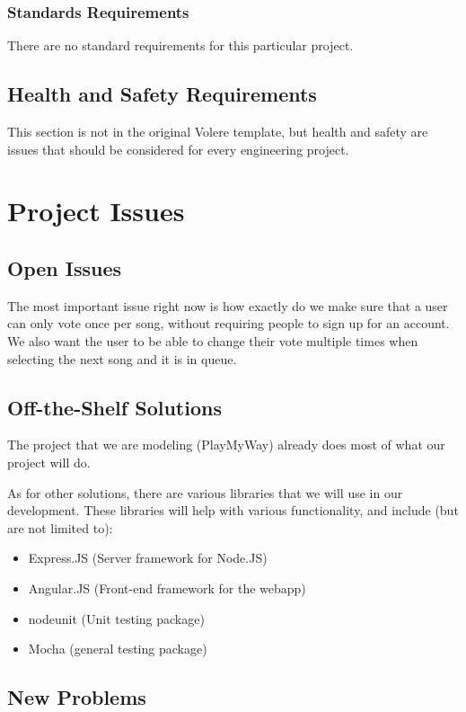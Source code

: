 \documentclass[12pt, titlepage]{article}
\begin{document}
\subsubsection{Standards Requirements}
There are no standard requirements for this particular project.

\subsection{Health and Safety Requirements}


This section is not in the original Volere template, but health and safety are
issues that should be considered for every engineering project.

\section{Project Issues}

\subsection{Open Issues}

The most important issue right now is how exactly do we make sure that a user can only vote once per song, without requiring people to sign up for an account. We also want the user to be able to change their vote multiple times when selecting the next song and it is in queue.

\subsection{Off-the-Shelf Solutions}

The project that we are modeling (PlayMyWay) already does most of what our project will do.

As for other solutions, there are various libraries that we will use in our
development. These libraries will help with various functionality, and include
(but are not limited to):
\begin{itemize}
\item Express.JS (Server framework for Node.JS)
\item Angular.JS (Front-end framework for the webapp)
\item nodeunit (Unit testing package)
\item Mocha (general testing package)
\end{itemize}
\subsection{New Problems}
\end{document}
